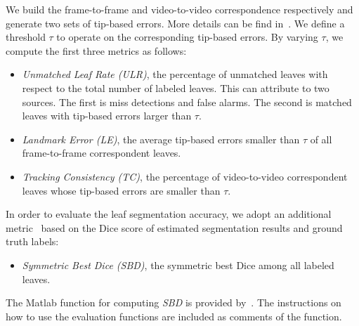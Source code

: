 We build the frame-to-frame and video-to-video correspondence respectively and generate two sets of tip-based errors.
More details can be find in~\cite{yin2015}.
We define a threshold $\tau$ to operate on the corresponding tip-based errors.
By varying $\tau$, we compute the first three metrics as follows:
\begin{itemize}
\item {\it{Unmatched Leaf Rate (ULR)}}, the percentage of unmatched leaves with respect to the total number of labeled leaves.
This can attribute to two sources.
The first is miss detections and false alarms.
The second is matched leaves with tip-based errors larger than $\tau$.
\item {\it{Landmark Error (LE)}}, the average tip-based errors smaller than $\tau$ of all frame-to-frame correspondent leaves.
\item {\it{Tracking Consistency (TC)}}, the percentage of video-to-video correspondent leaves whose tip-based errors are smaller than $\tau$.
\end{itemize}

In order to evaluate the leaf segmentation accuracy, we adopt an additional metric~\cite{scharr2014annotated} based on the Dice score of estimated segmentation results and ground truth labels:
\begin{itemize}
\item {\it{Symmetric Best Dice (SBD)}}, the symmetric best Dice among all labeled leaves.
\end{itemize}
The Matlab function for computing {\it{SBD}} is provided by~\cite{scharr2014annotated}.
The instructions on how to use the evaluation functions are included as comments of the function.


%




